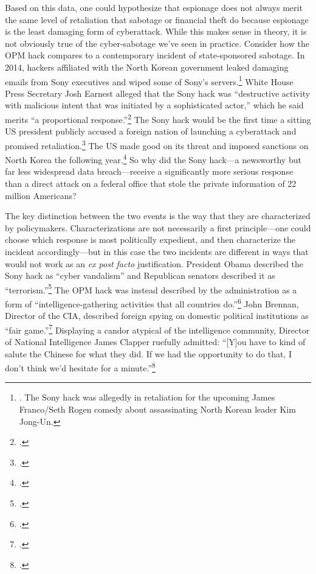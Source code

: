 \documentclass[12pt]{extarticle}
\begin{document}
Based on this data, one could hypothesize that espionage does not always merit the same level of retaliation that sabotage or financial theft do because espionage is the least damaging form of cyberattack. While this makes sense in theory, it is not obviously true of the cyber-sabotage we've seen in practice. Consider how the OPM hack compares to a contemporary incident of state-sponsored sabotage. In 2014, hackers affiliated with the North Korean government leaked damaging emails from Sony executives and wiped some of Sony's servers.\footnote{\cite{barnes_sony_2014}. The Sony hack was allegedly in retaliation for the upcoming James Franco/Seth Rogen comedy about assassinating North Korean leader Kim Jong-Un.} White House Press Secretary Josh Earnest alleged that the Sony hack was \enquote{destructive activity with malicious intent that was initiated by a sophisticated actor,} which he said merits \enquote{a proportional response.}\footcite{nakashima_white_2014} The Sony hack would be the first time a sitting US president publicly accused a foreign nation of launching a cyberattack and promised retaliation.\footcite{sanger_u.s._2016} The US made good on its threat and imposed sanctions on North Korea the following year.\footcite{lederman_us_2015} So why did the Sony hack---a newsworthy but far less widespread data breach---receive a significantly more serious response than a direct attack on a federal office that stole the private information of 22 million Americans?

The key distinction between the two events is the way that they are characterized by policymakers. Characterizations are not necessarily a first principle---one could choose which response is most politically expedient, and then characterize the incident accordingly---but in this case the two incidents are different in ways that would not work as an \emph{ex post facto} justification. President Obama described the Sony hack as \enquote{cyber vandalism} and Republican senators described it as \enquote{terrorism.}\footcite{fung_obama_2014} The OPM hack was instead described by the administration as a form of \enquote{intelligence-gathering activities that all countries do.}\footcite{finklea_cyber_2015} John Brennan, Director of the CIA, described foreign spying on domestic political institutions as ``fair game.''\footcite{sanger_u.s._2016} Displaying a candor atypical of the intelligence community,  Director of National Intelligence James Clapper ruefully admitted: ``[Y]ou have to kind of salute the Chinese for what they did. If we had the opportunity to do that, I don't think we'd hesitate for a minute.''\footcite{pepitone_clapper_2015}
\end{document}
